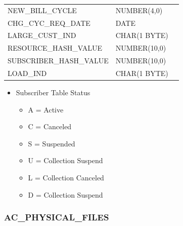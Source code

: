 \documentclass[12pt,twoside]{article}
\begin{document}
\begin{longtable}{lll}
 NEW\_BILL\_CYCLE         &  NUMBER(4,0)         &                    \\
 CHG\_CYC\_REQ\_DATE      &  DATE                &                    \\
 LARGE\_CUST\_IND         &  CHAR(1 BYTE)        &                    \\
 RESOURCE\_HASH\_VALUE    &  NUMBER(10,0)        &                    \\
 SUBSCRIBER\_HASH\_VALUE  &  NUMBER(10,0)        &                    \\
 LOAD\_IND                &  CHAR(1 BYTE)        &                    \\
\hline
\end{longtable}

\normalsize
\begin{itemize}
\item Subscriber Table Status
\begin{itemize}
\item A = Active
\item C = Canceled
\item S = Suspended
\item U = Collection Suspend
\item L = Collection Canceled
\item D = Collection Suspend
\end{itemize}
\end{itemize}
        
\subsubsection{AC\_PHYSICAL\_FILES}
\label{sec-8-3-6}
\end{document}
